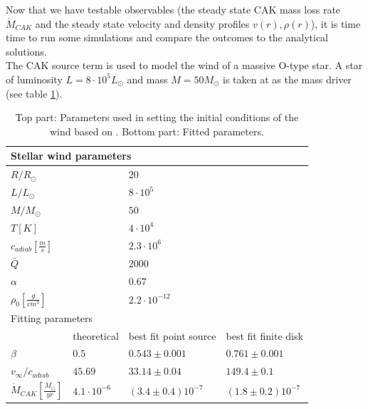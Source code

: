 Now that we have testable observables (the steady state CAK mass loss rate $\dot{M}_{CAK}$ and the steady state velocity and density profiles $v(r), \rho(r)$), it is time time to run some simulations and compare the outcomes to the analytical solutions.\\

The CAK source term is used to model the wind of a massive O-type star. A star of luminosity $L = 8\cdot 10^5 L_\odot$ and mass $M = 50 M_\odot$ is taken at as the mass driver (see table \ref{tab: CAK_res}). \\

\begin{table}[]
\centering
\caption{Top part: Parameters used in setting the initial conditions of the wind based on \citep{Sundqvist2013}. Bottom part: Fitted parameters.}
\label{tab: CAK_res}
\begin{tabular}{llll}
\hline
\hline
\multicolumn{4}{l}{Stellar wind parameters}                                           \\
\hline
$R/R_\odot$              &             & $20$ &\\
$L/L_\odot$              &             &  $8\cdot10^{5}$  &\\
$M/M_\odot$              &             & $50$ &\\
$T[K]$                   &             & $4\cdot10^{4}$ &\\
$c_{adiab}[\frac{m}{s}]$ &             & $2.3\cdot 10^{6}$ &\\
$\bar{Q}$ 				 &             & $2000$ &\\
$\alpha$                 &             & $0.67$ &\\
$\rho_0[\frac{g}{cm^3}]$ &             & $2.2\cdot 10^{-12}$ &\\
\hline
\hline
\multicolumn{4}{l}{Fitting parameters}                                                \\
                         & theoretical & best fit point source & best fit finite disk \\
\hline
$\beta$                  & $0.5$       & $0.543\pm 0.001$      &  $0.761 \pm 0.001$   \\
$v_{\infty}/c_{adiab}$   & $45.69$     & $33.14\pm 0.04$       &  $149.4 \pm 0.1$     \\
$\dot{M}_{CAK}[\frac{M_\odot}{yr}]$ & $4.1 \cdot 10^{-6}$  & $(3.4 \pm 0.4)10^{-7}$&  $(1.8\pm0.2)10^{-7}$ \\           
\end{tabular}
\end{table}



